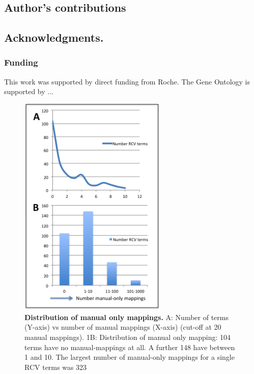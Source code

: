 \documentclass[runningheads,a4paper]{llncs}
\begin{document}
{{\subsection*{Author's contributions}


\subsection*{Acknowledgments.}

\subsubsection*{Funding}

This work was supported by direct funding from Roche.  The Gene Ontology is supported by ...










\begin{figure}
\centering
\includegraphics[width=70mm]{man_only.png}
\caption{\textbf{Distribution of manual only mappings.} A: Number of terms (Y-axis) vs number of manual mappings (X-axis) (cut-off at 20 manual mappings). 1B: Distribution of manual only mapping: 104 terms have no manual-mappings at all.  A further 148 have between 1 and 10.  The largest number of manual-only mappings for a single RCV terms was 323}
\label{fig:man_only}
\end{figure}

}}
\end{document}
